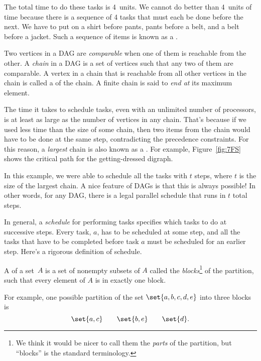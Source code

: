 The total time to do these tasks is 4~units.  We cannot do better than
4~units of time because there is a sequence of 4 tasks that must each
be done before the next.  We have to put on a shirt before pants,
pants before a belt, and a belt before a jacket.  Such a sequence of
items is known as a .

\begin{definition}
Two vertices in a DAG are \emph{comparable} when one of them is
reachable from the other.  A \emph{chain} in a DAG is a set of
vertices such that any two of them are comparable.  A vertex in a
chain that is reachable from all other vertices in the chain is called
a  of the chain.  A finite chain is said to
\emph{end at} its maximum element.
\end{definition}

The time it takes to schedule tasks, even with an unlimited number of
processors, is at least as large as the number of vertices in any
chain.  That's because if we used less time than the size of some
chain, then two items from the chain would have to be done at the same
step, contradicting the precedence constraints.  For this reason, a
\emph{largest} chain is also known as a .  For
example, Figure~\ref{fig:7FS} shows the critical path for the
getting-dressed digraph.

In this example, we were able to schedule all the tasks with $t$
steps, where $t$ is the size of the largest chain.  A nice feature of
DAGs is that this is always possible!  In other words, for any DAG,
there is a legal parallel schedule that runs in $t$ total steps.

In general, a \emph{schedule} for performing tasks specifies which
tasks to do at successive steps.  Every task, $a$, has to be scheduled
at some step, and all the tasks that have to be completed before task
$a$ must be scheduled for an earlier step.  Here's a rigorous
definition of schedule.

\begin{definition}\label{def:partition}
A  of a set~$A$ is a set of nonempty subsets of $A$
called the \emph{blocks}\footnote{We think it would be nicer to call
  them the \emph{parts} of the partition, but ``blocks'' is the
  standard terminology.} of the partition, such that every element of
$A$ is in exactly one block.
\end{definition}

For example, one possible partition of the set $\set{a, b, c, d, e}$
into three blocks is
\[
\set{a, c} \qquad \set{b, e} \qquad \set{d}.
\]

